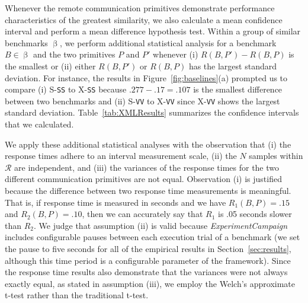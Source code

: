 \documentclass{sig-alternate}
\begin{document}
Whenever the remote communication primitives demonstrate performance
characteristics of the greatest similarity, we also calculate a mean
confidence interval and perform a mean difference hypothesis test.
Within a group of similar benchmarks $\upbeta$, we perform additional
statistical analysis for a benchmark $B \in \upbeta$ and the two
primitives $P$ and $P'$ whenever (i) $R(B,P') - R(B,P)$ is the
smallest or (ii) either $R(B,P')$ or $R(B,P)$ has the largest standard
deviation.  For instance, the results in Figure~\ref{fig:baselines}(a)
prompted us to compare (i) S-{\tt SS} to X-{\tt SS} because
$.277-.17=.107$ is the smallest difference between two benchmarks and
(ii) S-{\tt VV} to X-{\tt VV} since X-{\tt VV} shows the largest
standard deviation.  Table~\ref{tab:XMLResults} summarizes the
confidence intervals that we calculated.



We apply these additional statistical analyses with the observation
that (i) the response times adhere to an interval measurement scale,
(ii) the $N$ samples within $\mathcal{R}$ are independent, and (iii)
the variances of the response times for the two different
communication primitives are not equal.  Observation (i) is justified
because the difference between two response time measurements is
meaningful. That is, if response time is measured in seconds and we
have $R_1(B,P) = .15$ and $R_2(B,P) = .10$, then we can accurately say
that $R_1$ is .05 seconds slower than $R_2$.  We judge that assumption
(ii) is valid because {\em ExperimentCampaign} includes configurable
pauses between each execution trial of a benchmark (we set the pause
to five seconds for all of the empirical results in
Section~\ref{sec:results}, although this time period is a configurable
parameter of the framework).  Since the response time results also
demonstrate that the variances were not always exactly equal, as
stated in assumption (iii), we employ the Welch's approximate t-test
rather than the traditional t-test.



\end{document}
